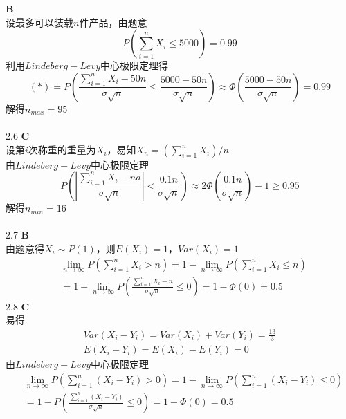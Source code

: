\documentclass[a4paper]{ctexart}    %
\begin{document}
	 \quad\textbf{B} \\
	设最多可以装载$n$件产品，由题意
	\begin{equation*}
		P\left(\sum\limits_{i=1}^{n} X_i \leq 5000 \right) = 0.99 \tag{$*$}
	\end{equation*}
	利用$Lindeberg-Levy$中心极限定理得
	\begin{equation*}
		(*)=P\left(\frac{\sum\limits_{i=1}^{n}X_i-50n}{\sigma \sqrt{n}} \leq \frac{5000-50n}{\sigma \sqrt{n}}\right)\approx \Phi\left(\frac{5000-50n}{\sigma \sqrt{n}} \right)=0.99
	\end{equation*}
	解得$n_{max}=95$\\
	\\
	2.6 \quad\textbf{C} \\
	设第$i$次称重的重量为$X_i$，易知$\overline{X}_n=\left(\sum\limits_{i=1}^{n}X_i \right)/ n$\\
	由$Lindeberg-Levy$中心极限定理
	\begin{equation*}
		P\left(\left|\frac{\sum\limits_{i=1}^{n}X_i-na}{\sigma\sqrt{n}}\right| < \frac{0.1 n}{\sigma \sqrt{n}}\right)\approx 2\Phi\left(\frac{0.1n}{\sigma \sqrt{n}}\right)-1 \geq 0.95
	\end{equation*}
	解得$n_{min} = 16$\\
	\\
	2.7 \quad\textbf{B} \\
	由题意得$X_i \sim P(1)$，则$E(X_i)=1$，$Var(X_i)=1$\\
	\begin{equation*}
		\begin{split}
			&\lim\limits_{n \to \infty}P\left(\sum\limits_{i=1}^{n}X_i > n\right)=1-\lim\limits_{n \to \infty}P\left(\sum\limits_{i=1}^{n}X_i \leq n \right)\\
			&=1-\lim\limits_{n \to \infty}P\left(\frac{\sum\limits_{i=1}^{n}X_i-n}{\sigma\sqrt{n}} \leq 0\right)=1-\Phi(0)=0.5
		\end{split}
	\end{equation*}
	2.8 \quad\textbf{C}\\
	易得
	\begin{equation*}
		\begin{split}
			Var(X_i-Y_i)=Var(X_i)+Var(Y_i)=\frac{13}{3}\\
			E(X_i-Y_i)=E(X_i)-E(Y_i)=0
		\end{split}
	\end{equation*}
	由$Lindeberg-Levy$中心极限定理
	\begin{equation*}
		\begin{split}
			&\lim\limits_{n \to \infty} P\left(\sum\limits_{i=1}^{n}(X_i-Y_i) > 0\right)=1-\lim\limits_{n \to \infty} P\left(\sum\limits_{i=1}^{n}(X_i-Y_i) \leq 0\right)\\
			&=1-P\left(\frac{\sum\limits_{i=1}^{n}(X_i-Y_i)}{\sigma \sqrt{n}} \leq 0\right) = 1-\Phi(0) = 0.5
		\end{split}
	\end{equation*}
\end{document}
